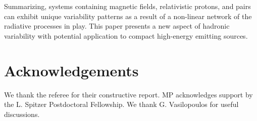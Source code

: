 \documentclass[fleqn,usenatbib]{mnras}
\begin{document}
Summarizing,  systems containing magnetic fields, relativistic protons, and pairs can exhibit unique variability patterns as a result of a non-linear network of the radiative processes in play. This paper presents a new aspect of hadronic variability with potential application to compact high-energy emitting sources.

\section*{Acknowledgements}
We thank the referee for their constructive report. MP acknowledges support by the L. Spitzer Postdoctoral Fellowship. We thank G. Vasilopoulos for useful discussions.


\end{document}
